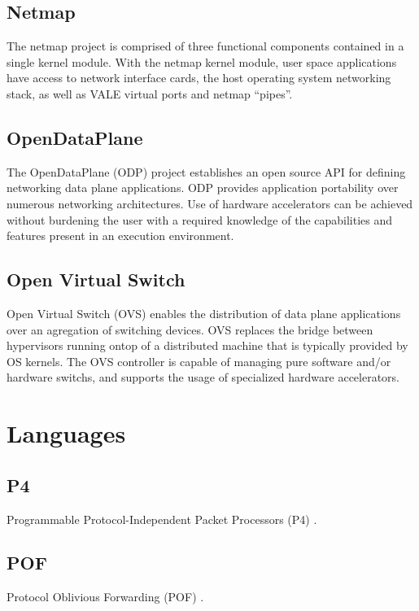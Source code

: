\subsection{Netmap}
\label{related:netmap}
The netmap project \cite{netmap} is comprised of three functional components
contained in a single kernel module. With the netmap kernel module, user space
applications have access to network interface cards, the host operating system
networking stack, as well as VALE virtual ports and netmap ``pipes''.

\subsection{OpenDataPlane}
\label{related:odp}
The OpenDataPlane (ODP) project \cite{odp} establishes an open source API for
defining networking data plane applications. ODP provides application
portability over numerous networking architectures. Use of hardware
accelerators can be achieved without burdening the user with a required
knowledge of the capabilities and features present in an execution environment.

\subsection{Open Virtual Switch}
\label{related:ovs}
Open Virtual Switch (OVS) \cite{ovs} enables the distribution of data
plane applications over an agregation of switching devices. OVS replaces
the bridge between hypervisors running ontop of a distributed machine that
is typically provided by OS kernels. The OVS controller is capable of managing
pure software and/or hardware switchs, and supports the usage of specialized
hardware accelerators.

\section{Languages}
\label{related:lang}

\subsection{P4}
\label{related:p4}
Programmable Protocol-Independent Packet Processors (P4) \cite{p4}.

\subsection{POF}
\label{related:pof}
Protocol Oblivious Forwarding (POF) \cite{pof}.

